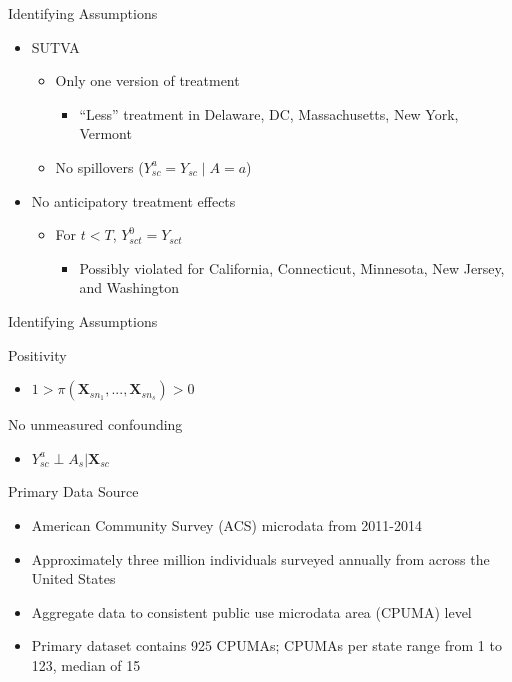 \documentclass[hyperref={pdfpagelabels=false}]{beamer}
\begin{document}
\begin{frame}{Identifying Assumptions}

\begin{itemize}
    \item SUTVA \bigskip
    \begin{itemize}
        \item Only one version of treatment \bigskip
        \begin{itemize}
            \item ``Less'' treatment in Delaware, DC, Massachusetts, New York, Vermont \bigskip
        \end{itemize}
        \item No spillovers ($Y^a_{sc} = Y_{sc} \mid A = a$) \bigskip
    \end{itemize}
    \item No anticipatory treatment effects \bigskip
    \begin{itemize}
        \item For $t < T$, $Y_{sct}^0 = Y_{sct}$ \bigskip
        \begin{itemize}
            \item Possibly violated for California, Connecticut, Minnesota, New Jersey, and Washington
        \end{itemize}
    \end{itemize}
\end{itemize}

\end{frame}

\begin{frame}{Identifying Assumptions}
    \item Positivity \bigskip
    \begin{itemize}
        \item $1 > \pi(\mathbf{X}_{sn_1}, ..., \mathbf{X}_{sn_s}) > 0$ \bigskip
    \end{itemize}
    \item No unmeasured confounding \bigskip
    \begin{itemize}
        \item $Y^a_{sc} \perp A_s | \mathbf{X}_{sc}$ \bigskip 
    \end{itemize}
\end{frame}

\begin{frame}{Primary Data Source}
    \begin{itemize}
    \item American Community Survey (ACS) microdata from 2011-2014 \bigskip 
    \item Approximately three million individuals surveyed annually from across the United States \bigskip 
    \item Aggregate data to consistent public use microdata area (CPUMA) level \bigskip
    \item Primary dataset contains 925 CPUMAs; CPUMAs per state range from 1 to 123, median of 15
    \end{itemize}
\end{frame}   
\end{document}
